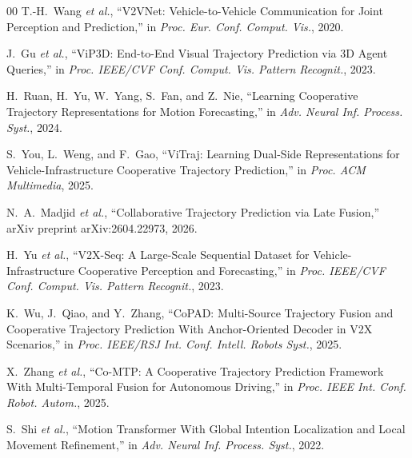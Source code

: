 \documentclass[lettersize,journal]{IEEEtran}
\begin{document}
\begin{thebibliography}{00}
T.-H.~Wang \emph{et al.}, ``V2VNet: Vehicle-to-Vehicle Communication for Joint Perception and Prediction,'' in \emph{Proc. Eur. Conf. Comput. Vis.}, 2020.

J.~Gu \emph{et al.}, ``ViP3D: End-to-End Visual Trajectory Prediction via 3D Agent Queries,'' in \emph{Proc. IEEE/CVF Conf. Comput. Vis. Pattern Recognit.}, 2023.

H.~Ruan, H.~Yu, W.~Yang, S.~Fan, and Z.~Nie, ``Learning Cooperative Trajectory Representations for Motion Forecasting,'' in \emph{Adv. Neural Inf. Process. Syst.}, 2024.

S.~You, L.~Weng, and F.~Gao, ``ViTraj: Learning Dual-Side Representations for Vehicle-Infrastructure Cooperative Trajectory Prediction,'' in \emph{Proc. ACM Multimedia}, 2025.

N.~A.~Madjid \emph{et al.}, ``Collaborative Trajectory Prediction via Late Fusion,'' arXiv preprint arXiv:2604.22973, 2026.

H.~Yu \emph{et al.}, ``V2X-Seq: A Large-Scale Sequential Dataset for Vehicle-Infrastructure Cooperative Perception and Forecasting,'' in \emph{Proc. IEEE/CVF Conf. Comput. Vis. Pattern Recognit.}, 2023.

K.~Wu, J.~Qiao, and Y.~Zhang, ``CoPAD: Multi-Source Trajectory Fusion and Cooperative Trajectory Prediction With Anchor-Oriented Decoder in V2X Scenarios,'' in \emph{Proc. IEEE/RSJ Int. Conf. Intell. Robots Syst.}, 2025.

X.~Zhang \emph{et al.}, ``Co-MTP: A Cooperative Trajectory Prediction Framework With Multi-Temporal Fusion for Autonomous Driving,'' in \emph{Proc. IEEE Int. Conf. Robot. Autom.}, 2025.

S.~Shi \emph{et al.}, ``Motion Transformer With Global Intention Localization and Local Movement Refinement,'' in \emph{Adv. Neural Inf. Process. Syst.}, 2022.
\end{thebibliography}
\end{document}
